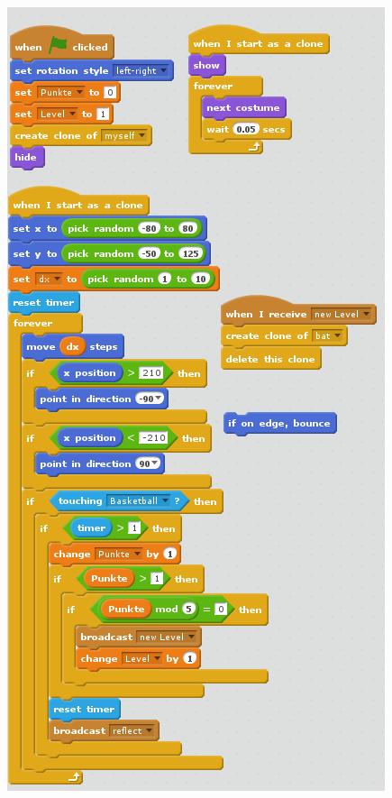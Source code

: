 \documentclass[10pt,a4paper,ngerman,twoside]{article} %
\begin{document}
\begin{minipage}{0.6\linewidth}
\begin{center}
\includegraphics[width=\linewidth]{scratch/fbatcode.png}
\end{center}    
\end{minipage}
\end{document}
